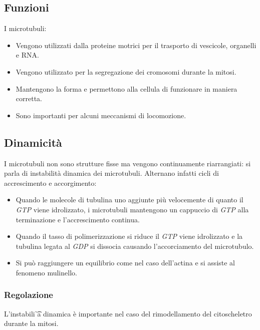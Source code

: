	\subsection{Funzioni}
	I microtubuli:
	\begin{multicols}{2}
		\begin{itemize}
			\item Vengono utilizzati dalla proteine motrici per il trasporto di vescicole, organelli e RNA.
			\item Vengono utilizzato per la segregazione dei cromosomi durante la mitosi.
			\item Mantengono la forma e permettono alla cellula di funzionare in maniera corretta.
			\item Sono importanti per alcuni meccanismi di locomozione.
		\end{itemize}
	\end{multicols}

	\subsection{Dinamicit\`a}
	I microtubuli non sono strutture fisse ma vengono continuamente riarrangiati: si parla di instabilit\`a dinamica dei microtubuli.
	Alternano infatti cicli di accrescimento e accorgimento:
	\begin{multicols}{2}
		\begin{itemize}
			\item Quando le molecole di tubulina uno aggiunte pi\`u velocemente di quanto il \emph{GTP} viene idrolizzato, i microtubuli mantengono un cappuccio di \emph{GTP} alla terminazione e l'accrescimento continua.
			\item Quando il tasso di polimerizzazione si riduce il \emph{GTP} viene idrolizzato e la tubulina legata al \emph{GDP} si dissocia causando l'accorciamento del microtubulo.
			\item Si pu\`o raggiungere un equilibrio come nel caso dell'actina e si assiste al fenomeno mulinello.
		\end{itemize}
	\end{multicols}

		\subsubsection{Regolazione}
		L'instabili\t`a dinamica \`e importante nel caso del rimodellamento del citoscheletro durante la mitosi.

